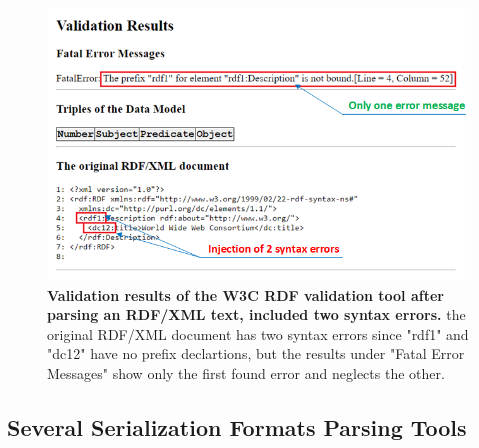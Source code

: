  \begin{figure}[ht]
		\begin{center}
						\setlength\belowcaptionskip{-7mm}
			\includegraphics[scale=0.8,angle=0]{images/errorW3RDFValidator.png}
			\caption{\textbf{Validation results of the W3C RDF validation tool \cite{W3C:Validation:Online} after parsing an RDF/XML text, included two syntax errors.} the original RDF/XML document has two syntax errors since "rdf1" and "dc12" have no prefix declartions, but the results under "Fatal Error Messages"  show only the first found error and neglects the other.}
			\label{Fig:errorW3RDFValidator}
		\end{center}
	\end{figure}
\subsection{Several Serialization Formats  Parsing Tools}

